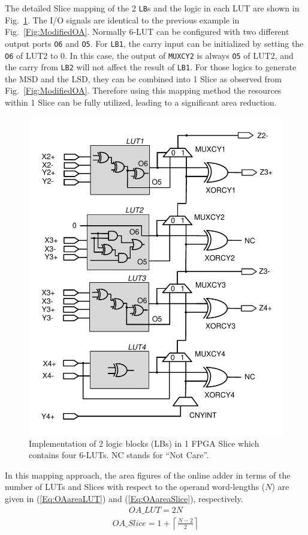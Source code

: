 \documentclass[conference]{IEEEtran}
\begin{document}
The detailed Slice mapping of the 2 \texttt{LB}s and the logic in each LUT are shown in Fig.~\ref{Fig:SliceNew}. The I/O signals are identical to the previous example in Fig.~\ref{Fig:ModifiedOA}. Normally 6-LUT can be configured with two different output ports \texttt{O6} and \texttt{O5}. For \texttt{LB1}, the carry input can be initialized by setting the \texttt{O6} of LUT2 to 0. In this case, the output of \texttt{MUXCY2} is always \texttt{O5} of LUT2, and the carry from \texttt{LB2} will not affect the result of \texttt{LB1}. For those logics to generate the MSD and the LSD, they can be combined into 1 Slice as observed from Fig.~\ref{Fig:ModifiedOA}. Therefore using this mapping method the resources within 1 Slice can be fully utilized, leading to a significant area reduction.

\begin{figure}[tbp]
	\centering
	\includegraphics[width=.5\textwidth]{./Figures/SDadder_FastCarry_New2.pdf}
	\caption{Implementation of 2 logic blocks (LBs) in 1 FPGA Slice which contains four 6-LUTs. NC stands for ``Not Care''.}
	\vspace{-1ex}	
	\label{Fig:SliceNew}
\end{figure}

In this mapping approach, the area figures of the online adder in terms of the number of LUTs and Slices with respect to the operand word-lengths ($N$) are given in (\ref{Eq:OAareaLUT}) and (\ref{Eq:OAareaSlice}), respectively.
\begin{eqnarray}\label{Eq:OAareaLUT}
	OA\_LUT = 2N
\end{eqnarray}
%
\begin{eqnarray}\label{Eq:OAareaSlice}
	OA\_Slice = 1+\left\lceil\frac{N-2}{2}\right\rceil
\end{eqnarray}
\end{document}
